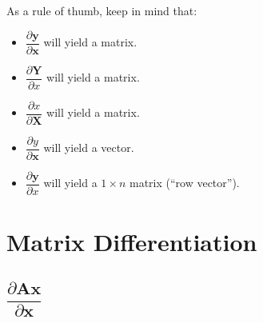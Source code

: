 \documentclass{article}
\begin{document}
As a rule of thumb, keep in mind that:
\begin{itemize}
    \item \(\dfrac{\partial \mathbf{y}}{\partial \mathbf{x}}\) will yield a matrix.
    \item \(\dfrac{\partial \mathbf{Y}}{\partial x}\) will yield a matrix.
    \item \(\dfrac{\partial x}{\partial \mathbf{X}}\) will yield a matrix.
    \item \(\dfrac{\partial y}{\partial \mathbf{x}}\) will yield a vector.
    \item \(\dfrac{\partial \mathbf{y}}{\partial x}\) will yield a \(1\times n\) matrix (``row vector'').
\end{itemize}

\section{Matrix Differentiation}\label{sec:diff}

\subsection{\(\dfrac{\partial \mathbf{A}  \mathbf{x}}{\partial \mathbf{x}}\)}
\end{document}
